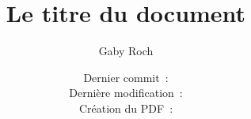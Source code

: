 

\title{Le titre du document}

\author{Gaby Roch}


\date{Dernier commit~: \\Dernière modification~: \\Création du PDF~: \DTMnow\\\\}


